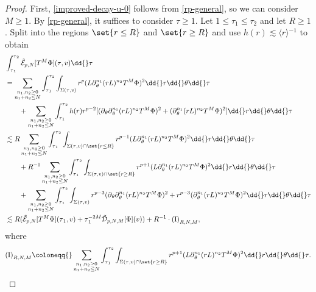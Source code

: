 \documentclass[10pt, reqno]{amsart}
\begin{document}
\begin{proof}
First, \cref{improved-decay-u-0} follows from \cref{rp-general}, so we can consider
\(M\ge 1\). By \cref{rp-general}, it suffices to consider \(\tau{}\ge 1\).
Let \(1\le \tau_1\le \tau_2\) and let \(R\ge 1\). Split into the regions
\(\set{r\le R}\) and \(\set{r\ge R}\) and use \(h(r)\lesssim \langle{}r\rangle{}^{-1}\) to obtain
\begin{equation}\label{improved-T-decay-u-0}
\begin{split}
&\int_{\tau{}_1}^{\tau{}_2} \tilde{\mathcal{E}}_{p,N}[T^M\Phi{}](\tau{},v)\dd{}\tau{} \\
&= \sum_{\substack{n_1,n_2\ge 0 \\ n_1+n_2\le N}}\int_{\tau{}_1}^{\tau{}_2} \int _{\Sigma{}(\tau{},v)} r^p(L\partial{}_\theta^{n_1}(rL)^{n_2}T^M\Phi{})^2 \dd{}r\dd{}\theta{}\dd{}\tau{} \\
&\qquad + \sum_{\substack{n_1,n_2\ge 0 \\ n_1+n_2\le N}}\int_{\tau{}_1}^{\tau{}_2} h(r)r^{p-2}[(\partial{}_\theta{}\partial{}_\theta^{n_1}(rL)^{n_2}T^M\Phi{})^2 + (\partial{}_\theta^{n_1}(rL)^{n_2}T^M\Phi{})^2] \dd{}r\dd{}\theta{}\dd{}\tau{} \\
&\lesssim R\sum_{\substack{n_1,n_2\ge 0 \\ n_1+n_2\le N}} \int_{\tau{}_1}^{\tau{}_2} \int _{\Sigma{}(\tau{},v)\cap \set{r\le R}} r^{p-1}(L\partial{}_\theta^{n_1}(rL)^{n_2}T^M\Phi{})^2\dd{}r\dd{}\theta{}\dd{}\tau{} \\
&\qquad + R^{-1}\sum_{\substack{n_1,n_2\ge 0 \\ n_1+n_2\le N}}\int_{\tau{}_1}^{\tau{}_2} \int _{\Sigma{}(\tau{},v)\cap \set{r\ge R}} r^{p+1}(L\partial{}_\theta^{n_1}(rL)^{n_2}T^M\Phi{})^2\dd{}r\dd{}\theta{}\dd{}\tau{} \\
&\qquad  + \sum_{\substack{n_1,n_2\ge 0 \\ n_1+n_2\le N}}\int_{\tau{}_1}^{\tau{}_2} \int _{\Sigma{}(\tau{},v)} r^{p-3}(\partial{}_\theta{}\partial{}_\theta^{n_1}(rL)^{n_2}T^M\Phi{})^2 + r^{p-3}(\partial{}_\theta^{n_1}(rL)^{n_2}T^M\Phi{})^2 \dd{}r\dd{}\theta{}\dd{}\tau{} \\
&\lesssim R (\tilde{\mathcal{E}}_{p,N}[T^M\Phi{}](\tau{}_1,v) + \tau{}_1^{-2M} \tilde{\mathcal{D}}_{p,N,M}[\Phi{}](v))  + R^{-1}\cdot \textnormal{(I)}_{R,N,M},
\end{split}
\end{equation}
where
\begin{equation}
\textnormal{(I)}_{R,N,M}\coloneqq{}\sum_{\substack{n_1,n_2\ge 0 \\ n_1+n_2\le N}}\int_{\tau{}_1}^{\tau{}_2} \int _{\Sigma{}(\tau{},v)\cap \set{r\ge R}} r^{p+1}(L\partial{}_\theta^{n_1}(rL)^{n_2}T^M\Phi{})^2\dd{}r\dd{}\theta{}\dd{}\tau{}.

\end{equation}
\end{proof}
\end{document}
